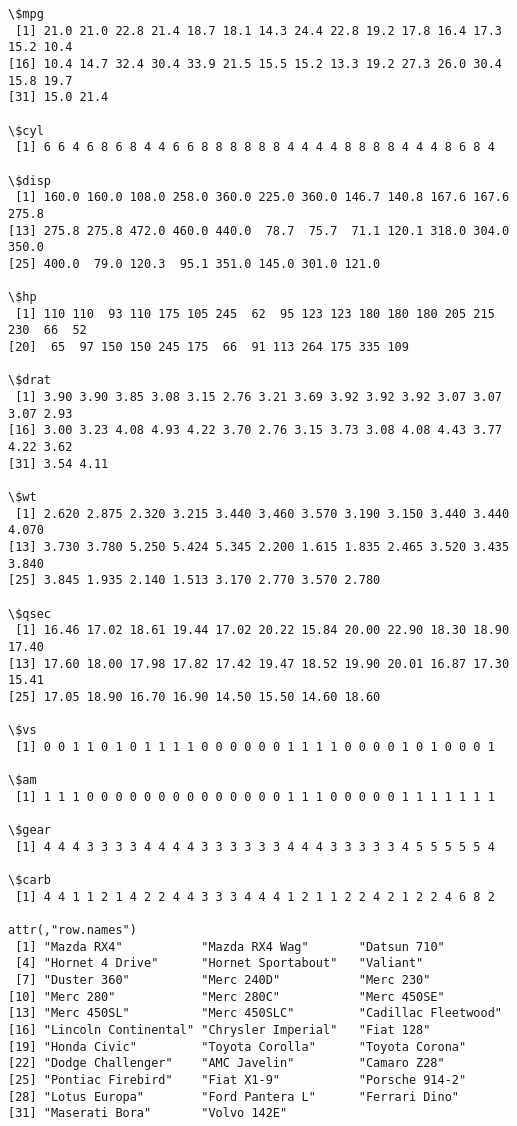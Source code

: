 \documentclass[11pt]{article}
\begin{document}
    \begin{Verbatim}[commandchars=\\\{\}]
\$mpg
 [1] 21.0 21.0 22.8 21.4 18.7 18.1 14.3 24.4 22.8 19.2 17.8 16.4 17.3 15.2 10.4
[16] 10.4 14.7 32.4 30.4 33.9 21.5 15.5 15.2 13.3 19.2 27.3 26.0 30.4 15.8 19.7
[31] 15.0 21.4

\$cyl
 [1] 6 6 4 6 8 6 8 4 4 6 6 8 8 8 8 8 8 4 4 4 4 8 8 8 8 4 4 4 8 6 8 4

\$disp
 [1] 160.0 160.0 108.0 258.0 360.0 225.0 360.0 146.7 140.8 167.6 167.6 275.8
[13] 275.8 275.8 472.0 460.0 440.0  78.7  75.7  71.1 120.1 318.0 304.0 350.0
[25] 400.0  79.0 120.3  95.1 351.0 145.0 301.0 121.0

\$hp
 [1] 110 110  93 110 175 105 245  62  95 123 123 180 180 180 205 215 230  66  52
[20]  65  97 150 150 245 175  66  91 113 264 175 335 109

\$drat
 [1] 3.90 3.90 3.85 3.08 3.15 2.76 3.21 3.69 3.92 3.92 3.92 3.07 3.07 3.07 2.93
[16] 3.00 3.23 4.08 4.93 4.22 3.70 2.76 3.15 3.73 3.08 4.08 4.43 3.77 4.22 3.62
[31] 3.54 4.11

\$wt
 [1] 2.620 2.875 2.320 3.215 3.440 3.460 3.570 3.190 3.150 3.440 3.440 4.070
[13] 3.730 3.780 5.250 5.424 5.345 2.200 1.615 1.835 2.465 3.520 3.435 3.840
[25] 3.845 1.935 2.140 1.513 3.170 2.770 3.570 2.780

\$qsec
 [1] 16.46 17.02 18.61 19.44 17.02 20.22 15.84 20.00 22.90 18.30 18.90 17.40
[13] 17.60 18.00 17.98 17.82 17.42 19.47 18.52 19.90 20.01 16.87 17.30 15.41
[25] 17.05 18.90 16.70 16.90 14.50 15.50 14.60 18.60

\$vs
 [1] 0 0 1 1 0 1 0 1 1 1 1 0 0 0 0 0 0 1 1 1 1 0 0 0 0 1 0 1 0 0 0 1

\$am
 [1] 1 1 1 0 0 0 0 0 0 0 0 0 0 0 0 0 0 1 1 1 0 0 0 0 0 1 1 1 1 1 1 1

\$gear
 [1] 4 4 4 3 3 3 3 4 4 4 4 3 3 3 3 3 3 4 4 4 3 3 3 3 3 4 5 5 5 5 5 4

\$carb
 [1] 4 4 1 1 2 1 4 2 2 4 4 3 3 3 4 4 4 1 2 1 1 2 2 4 2 1 2 2 4 6 8 2

attr(,"row.names")
 [1] "Mazda RX4"           "Mazda RX4 Wag"       "Datsun 710"         
 [4] "Hornet 4 Drive"      "Hornet Sportabout"   "Valiant"            
 [7] "Duster 360"          "Merc 240D"           "Merc 230"           
[10] "Merc 280"            "Merc 280C"           "Merc 450SE"         
[13] "Merc 450SL"          "Merc 450SLC"         "Cadillac Fleetwood" 
[16] "Lincoln Continental" "Chrysler Imperial"   "Fiat 128"           
[19] "Honda Civic"         "Toyota Corolla"      "Toyota Corona"      
[22] "Dodge Challenger"    "AMC Javelin"         "Camaro Z28"         
[25] "Pontiac Firebird"    "Fiat X1-9"           "Porsche 914-2"      
[28] "Lotus Europa"        "Ford Pantera L"      "Ferrari Dino"       
[31] "Maserati Bora"       "Volvo 142E"         

    \end{Verbatim}
\end{document}
